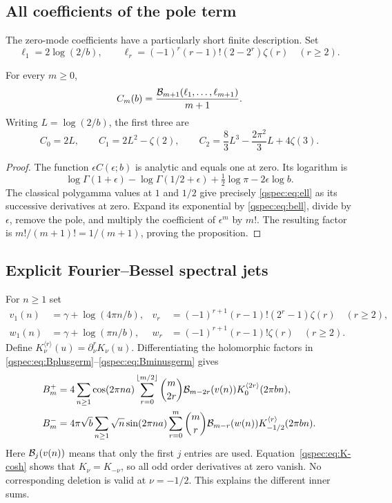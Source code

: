\subsection{All coefficients of the pole term}
The zero-mode coefficients have a particularly short finite description.
Set
\begin{equation}\label{qspec:eq:ell}
\ell_1=2\log(2/b),\qquad
\ell_r=(-1)^r(r-1)!(2-2^r)\zeta(r)\quad(r\ge2).
\end{equation}
\begin{proposition}\label{qspec:prop:pole-bell}
For every $m\ge0$,
\begin{equation}\label{qspec:eq:Cbell}
C_m(b)=\frac{\mathcal B_{m+1}(\ell_1,\ldots,\ell_{m+1})}{m+1}.
\end{equation}
Writing $L=\log(2/b)$, the first three are
\begin{equation}\label{qspec:eq:Cexamples}
C_0=2L,\qquad C_1=2L^2-\zeta(2),\qquad
C_2=\frac83L^3-\frac{2\pi^2}{3}L+4\zeta(3).
\end{equation}
\end{proposition}
\begin{proof}
The function $\epsilon C(\epsilon;b)$ is analytic and equals one at zero.
Its logarithm is
\[
\log\Gamma(1+\epsilon)-\log\Gamma(1/2+\epsilon)
+\tfrac12\log\pi-2\epsilon\log b.
\]
The classical polygamma values at $1$ and $1/2$ \cite{gamma} give precisely
\eqref{qspec:eq:ell} as its successive derivatives at zero. Expand its
exponential by \eqref{qspec:eq:bell}, divide by $\epsilon$, remove the
pole, and multiply the coefficient of $\epsilon^m$ by $m!$. The resulting
factor is $m!/(m+1)!=1/(m+1)$, proving the proposition.
\end{proof}

\subsection{Explicit Fourier--Bessel spectral jets}
For $n\ge1$ set
\begin{align}
v_1(n)&=\gamma+\log(4\pi n/b),&
v_r&=(-1)^{r+1}(r-1)!(2^r-1)\zeta(r)\quad(r\ge2),\label{qspec:eq:vjets}\\
w_1(n)&=\gamma+\log(\pi n/b),&
w_r&=(-1)^{r+1}(r-1)!\zeta(r)\quad(r\ge2).\label{qspec:eq:wjets}
\end{align}
Define $K^{\langle r\rangle}_\nu(u)=\partial_\nu^rK_\nu(u)$.
Differentiating the holomorphic factors in
\eqref{qspec:eq:Bplusgerm}--\eqref{qspec:eq:Bminusgerm} gives
\begin{align}
B_m^+={}&4\sum_{n\ge1}\cos(2\pi na)
 \sum_{r=0}^{\lfloor m/2\rfloor}\binom{m}{2r}
 \mathcal B_{m-2r}(v(n))K^{\langle2r\rangle}_0(2\pi bn),\label{qspec:eq:Bplusjets}\\
B_m^-={}&4\pi\sqrt b\sum_{n\ge1}\sqrt n\sin(2\pi na)
 \sum_{r=0}^m\binom mr\mathcal B_{m-r}(w(n))
 K^{\langle r\rangle}_{-1/2}(2\pi bn).
\label{qspec:eq:Bminusjets}
\end{align}
Here $\mathcal B_j(v(n))$ means that only the first $j$ entries are used.
Equation~\eqref{qspec:eq:K-cosh} shows that $K_\nu=K_{-\nu}$, so all
odd order derivatives at zero vanish. No corresponding deletion is valid
at $\nu=-1/2$. This explains the different inner sums.


